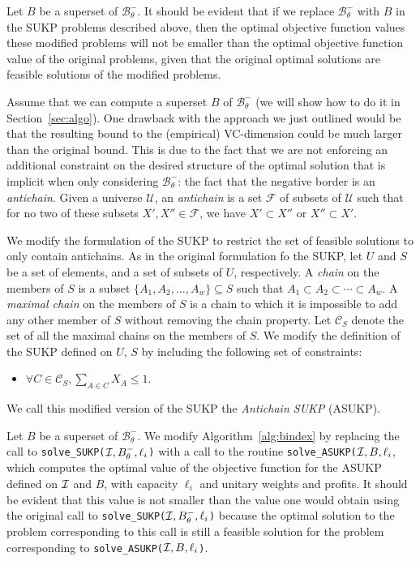 Let $B$ be a superset of $\mathcal{B}^-_\theta$. It should be evident that if we
replace $\mathcal{B}^-_\theta$ with $B$ in the SUKP problems described above,
then the optimal objective function values these modified problems will not be
smaller than the optimal objective function value of the original problems,
given that the original optimal solutions are feasible solutions of the modified
problems. 

Assume that we can compute a superset $B$ of $\mathcal{B}^-_\theta$ (we will
show how to do it in Section~\ref{sec:algo}). One drawback with the approach we
just outlined would be that the resulting bound to the (empirical) VC-dimension
could be much larger than the original bound. This is due to the fact that we
are not enforcing an additional constraint on the desired structure of the
optimal solution that is implicit when only considering $\mathcal{B}^-_\theta$:
the fact that the negative border is an \emph{antichain}.
Given a universe $\mathcal{U}$, an \emph{antichain} is a set
$\mathcal{F}$ of subsets of $\mathcal{U}$ such that for no two of these subsets
$X',X''\in\mathcal{F}$, we have $X'\subset X''$ or $X''\subset X'$.

We modify the formulation of the SUKP to restrict the set of feasible solutions
to only contain antichains. As in the original formulation fo the SUKP, let $U$
and $S$ be a set of elements, and a set of subsets of $U$, respectively. A \emph{chain}
on the members of $S$ is a subset $\{A_1,A_2,\dotsc,A_w\}\subseteq S$ such that
$A_1\subset A_2\subset\dotsb\subset A_w$. A \emph{maximal chain} on the members
of $S$ is a chain to which it is impossible to add any other member of $S$
without removing the chain property. Let $\mathcal{C}_S$ denote the set of all
the maximal chains on the members of $S$.
We modify the definition of the SUKP defined on $U$, $S$ by including
the following set of constraints:
\begin{itemize}
  \item $\forall C\in\mathcal{C}_S, \sum_{A\in C} X_A\le 1$.
\end{itemize}
We call this modified version of the SUKP the \emph{Antichain SUKP} (ASUKP).

Let $B$ be a superset of $\mathcal{B}^-_\theta$. We modify
Algorithm~\ref{alg:bindex} by replacing the call to \texttt{solve\_SUKP(${\cal I},B^-_\theta,\ell_i$)}
with a call to the routine \texttt{solve\_ASUKP(${\cal I},B,\ell_i$}, which computes the
optimal value of the objective function for the ASUKP defined on ${\cal I}$ and $B$, with
capacity $\ell_i$ and unitary weights and profits. It should be evident that
this value is not smaller than the value one would obtain using the original
call to \texttt{solve\_SUKP(${\cal I},B^-_\theta,\ell_i$)} because the optimal
solution to the problem corresponding to this call is still a feasible solution
for the problem corresponding to \texttt{solve\_ASUKP(${\cal I},B,\ell_i$)}.

